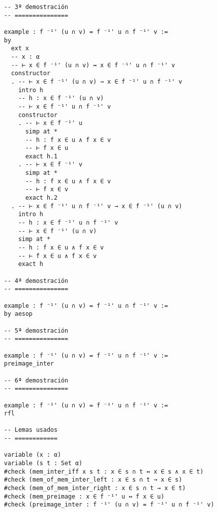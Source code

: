 \begin{verbatim}
-- 3ª demostración
-- ===============

example : f ⁻¹' (u ∩ v) = f ⁻¹' u ∩ f ⁻¹' v :=
by
  ext x
  -- x : α
  -- ⊢ x ∈ f ⁻¹' (u ∩ v) ↔ x ∈ f ⁻¹' u ∩ f ⁻¹' v
  constructor
  . -- ⊢ x ∈ f ⁻¹' (u ∩ v) → x ∈ f ⁻¹' u ∩ f ⁻¹' v
    intro h
    -- h : x ∈ f ⁻¹' (u ∩ v)
    -- ⊢ x ∈ f ⁻¹' u ∩ f ⁻¹' v
    constructor
    . -- ⊢ x ∈ f ⁻¹' u
      simp at *
      -- h : f x ∈ u ∧ f x ∈ v
      -- ⊢ f x ∈ u
      exact h.1
    . -- ⊢ x ∈ f ⁻¹' v
      simp at *
      -- h : f x ∈ u ∧ f x ∈ v
      -- ⊢ f x ∈ v
      exact h.2
  . -- ⊢ x ∈ f ⁻¹' u ∩ f ⁻¹' v → x ∈ f ⁻¹' (u ∩ v)
    intro h
    -- h : x ∈ f ⁻¹' u ∩ f ⁻¹' v
    -- ⊢ x ∈ f ⁻¹' (u ∩ v)
    simp at *
    -- h : f x ∈ u ∧ f x ∈ v
    -- ⊢ f x ∈ u ∧ f x ∈ v
    exact h

-- 4ª demostración
-- ===============

example : f ⁻¹' (u ∩ v) = f ⁻¹' u ∩ f ⁻¹' v :=
by aesop

-- 5ª demostración
-- ===============

example : f ⁻¹' (u ∩ v) = f ⁻¹' u ∩ f ⁻¹' v :=
preimage_inter

-- 6ª demostración
-- ===============

example : f ⁻¹' (u ∩ v) = f ⁻¹' u ∩ f ⁻¹' v :=
rfl

-- Lemas usados
-- ============

variable (x : α)
variable (s t : Set α)
#check (mem_inter_iff x s t : x ∈ s ∩ t ↔ x ∈ s ∧ x ∈ t)
#check (mem_of_mem_inter_left : x ∈ s ∩ t → x ∈ s)
#check (mem_of_mem_inter_right : x ∈ s ∩ t → x ∈ t)
#check (mem_preimage : x ∈ f ⁻¹' u ↔ f x ∈ u)
#check (preimage_inter : f ⁻¹' (u ∩ v) = f ⁻¹' u ∩ f ⁻¹' v)
\end{verbatim}

